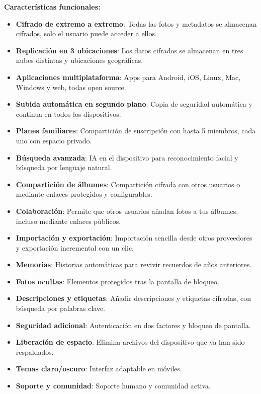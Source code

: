 \textbf{Características funcionales:}
\begin{itemize}
    \item \textbf{Cifrado de extremo a extremo}: Todas las fotos y metadatos se almacenan cifrados, solo el usuario puede acceder a ellos.
    \item \textbf{Replicación en 3 ubicaciones}: Los datos cifrados se almacenan en tres nubes distintas y ubicaciones geográficas.
    \item \textbf{Aplicaciones multiplataforma}: Apps para Android, iOS, Linux, Mac, Windows y web, todas open source.
    \item \textbf{Subida automática en segundo plano}: Copia de seguridad automática y continua en todos los dispositivos.
    \item \textbf{Planes familiares}: Compartición de suscripción con hasta 5 miembros, cada uno con espacio privado.
    \item \textbf{Búsqueda avanzada}: IA en el dispositivo para reconocimiento facial y búsqueda por lenguaje natural.
    \item \textbf{Compartición de álbumes}: Compartición cifrada con otros usuarios o mediante enlaces protegidos y configurables.
    \item \textbf{Colaboración}: Permite que otros usuarios añadan fotos a tus álbumes, incluso mediante enlaces públicos.
    \item \textbf{Importación y exportación}: Importación sencilla desde otros proveedores y exportación incremental con un clic.
    \item \textbf{Memorias}: Historias automáticas para revivir recuerdos de años anteriores.
    \item \textbf{Fotos ocultas}: Elementos protegidos tras la pantalla de bloqueo.
    \item \textbf{Descripciones y etiquetas}: Añadir descripciones y etiquetas cifradas, con búsqueda por palabras clave.
    \item \textbf{Seguridad adicional}: Autenticación en dos factores y bloqueo de pantalla.
    \item \textbf{Liberación de espacio}: Elimina archivos del dispositivo que ya han sido respaldados.
    \item \textbf{Temas claro/oscuro}: Interfaz adaptable en móviles.
    \item \textbf{Soporte y comunidad}: Soporte humano y comunidad activa.
\end{itemize}

